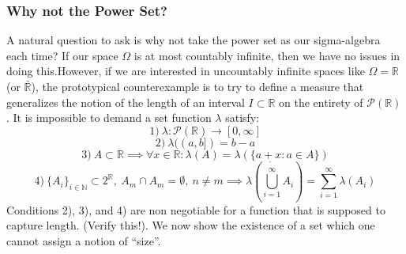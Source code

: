 \documentclass{article}
\begin{document}
\subsubsection{Why not the Power Set?}
A natural question to ask is why not take the power set as our sigma-algebra each time? If our space $\Omega$ is at most countably infinite, then we have no issues in doing this.\newline \newline  However, if we are interested in uncountably infinite spaces like $\Omega = \mathbb{R}$ (or $\bar{\mathbb{R}}$), the prototypical counterexample is to try to define a measure that generalizes the notion of the length of an interval $I\subset\mathbb{R}$ on the entirety of $\mathcal{P}(\mathbb{R})$. \newline \newline
It is impossible to demand a set function $\lambda$ satisfy: 
\[
1) \ \lambda :\mathcal{P}(\mathbb{R}) \to [0, \infty]
\]
\[
2) \ \lambda((a,b]) = b-a
\]
\[
3) \ A \subset \mathbb{R} \implies \forall x \in \mathbb{R}:
\lambda(A) = \lambda(\{a+x:a\in A\})
\]
\[
4) \ \{A_i\}_{i \in \mathbb{N}} \subset 2^{\mathbb{R}},\ A_m \cap A_m = \emptyset, \ n\neq m \implies \lambda(\dot{\bigcup_{i=1}^{\infty}}A_i) = \sum_{i=1}^{\infty}\lambda(A_i)
\]
Conditions 2), 3), and 4) are non negotiable for a function that is supposed to capture length. (Verify this!). We now show the existence of a set which one cannot assign a notion of ``size''.
\end{document}
